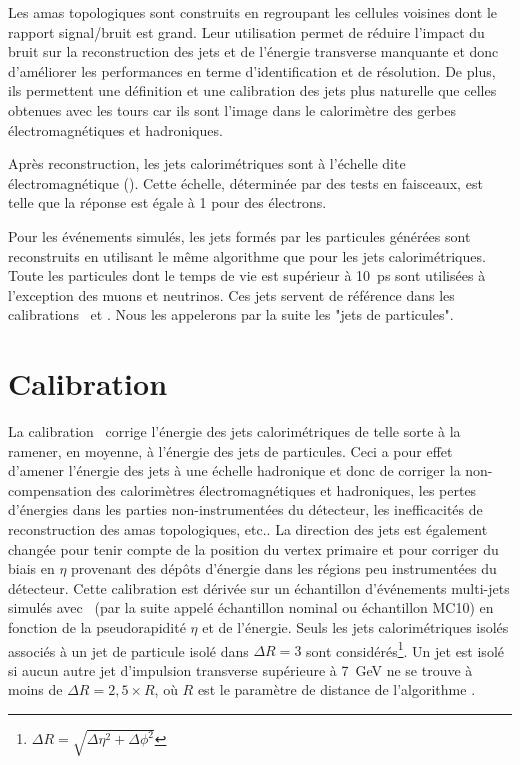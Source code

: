 Les amas topologiques sont construits en regroupant les cellules voisines dont le rapport signal/bruit est grand. Leur utilisation permet de r\'eduire l'impact du bruit sur la reconstruction des jets et de l'\'energie transverse manquante et donc d'am\'eliorer les performances en terme d'identification et de r\'esolution. De plus, ils permettent une d\'efinition et une calibration des jets plus naturelle que celles obtenues avec les tours car ils sont l'image dans le calorim\`etre des gerbes \'electromagn\'etiques et hadroniques. %

Apr\`es reconstruction, les jets calorim\'etriques sont \`a l'\'echelle dite \'electromagn\'etique (\EM). Cette \'echelle, d\'etermin\'ee par des tests en faisceaux, est telle que la r\'eponse est \'egale \`a 1 pour des \'electrons. 

Pour les \'ev\'enements simul\'es, les jets form\'es par les particules g\'en\'er\'ees sont reconstruits en utilisant le m\^eme algorithme que pour les jets calorim\'etriques. Toute les particules dont le temps de vie est sup\'erieur \`a 10~ps sont utilis\'ees \`a l'exception des muons et neutrinos. Ces jets servent de r\'ef\'erence dans les calibrations \EMJES~et \GS. Nous les appelerons par la suite les "jets de particules".

\section{Calibration \EMJES}
\label{sec:EMJES}

 La calibration \EMJES~corrige l'\'energie des jets calorim\'etriques de telle sorte \`a la ramener, en moyenne, \`a l'\'energie des jets de particules. Ceci a pour effet d'amener l'\'energie des jets \`a une \'echelle hadronique et donc de corriger 
la non-compensation des calorim\`etres \'electromagn\'etiques et hadroniques, les pertes d'énergies dans les parties non-instrumentées du détecteur, les inefficacités de reconstruction des amas topologiques, etc.. La direction des jets est \'egalement chang\'ee pour tenir compte de la position du vertex primaire et pour corriger du biais en $\eta$ provenant des d\'ep\^ots d'\'energie dans les r\'egions peu instrument\'ees du d\'etecteur. Cette calibration est d\'eriv\'ee sur un \'echantillon d'\'ev\'enements multi-jets simul\'es avec \pythia~(par la suite appel\'e \'echantillon nominal ou \'echantillon \pythia MC10) en fonction de la pseudorapidit\'e $\eta$ et de l'\'energie. Seuls les jets calorim\'etriques isol\'es associ\'es \`a un jet de particule isol\'e dans $\Delta R=3$ sont consid\'er\'es\footnote{$\Delta R=\sqrt{\Delta\eta^2+\Delta\phi^2}$}. Un jet est isol\'e si aucun autre jet d'impulsion transverse sup\'erieure \`a 7~GeV ne se trouve \`a moins de $\Delta R=2,5\times R$, o\`u $R$ est le param\`etre de distance de l'algorithme \antikt. 


